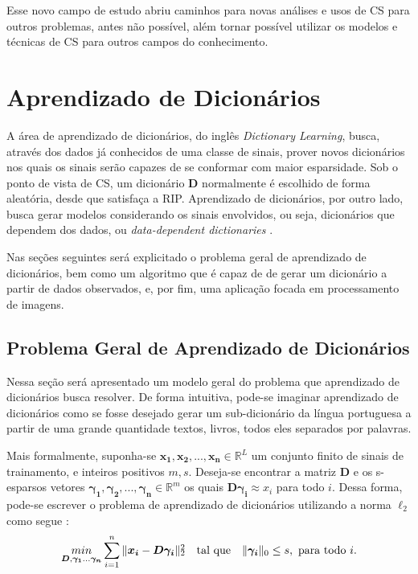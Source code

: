 \documentclass[cic,tc]{iiufrgs}
\def\SPSB#1#2{\rlap{\textsuperscript{#1}}\SB{#2}}
\def\SB#1{\textsubscript{#1}}
\renewcommand{\vec}[1]{\bm{#1}}
\newcommand{\mat}[1]{\bm{#1}}
\begin{document}
Esse novo campo de estudo abriu caminhos para novas análises e usos de CS para outros
problemas, antes não possível, além tornar possível utilizar os modelos e técnicas de CS
para outros campos do conhecimento.


\section{Aprendizado de Dicionários}
A área de aprendizado de dicionários, do inglês \textit{Dictionary Learning}, busca, através
dos dados já conhecidos de uma classe de sinais, prover novos dicionários nos quais os sinais 
serão capazes de se conformar com maior esparsidade. 
Sob o ponto de vista de CS, um dicionário $\mat{D}$ normalmente é escolhido de forma aleatória,
desde que satisfaça a RIP.
Aprendizado de dicionários, por outro lado, busca gerar modelos considerando os sinais envolvidos,
ou seja, dicionários que dependem dos dados, ou \textit{data-dependent dictionaries} \cite{chen2015compressed}.

Nas seções seguintes será explicitado o problema geral de aprendizado de dicionários, bem como 
um algoritmo que é capaz de de gerar um dicionário a partir de dados observados, e, por fim, 
uma aplicação focada em processamento de imagens.

\subsection{Problema Geral de Aprendizado de Dicionários}
Nessa seção será apresentado um modelo geral do problema que aprendizado de dicionários busca resolver.
De forma intuitiva, pode-se imaginar aprendizado de dicionários como se fosse desejado gerar 
um sub-dicionário da língua portuguesa a partir de uma grande quantidade textos, livros, todos 
eles separados por palavras.

Mais formalmente, suponha-se $\vec{x_1}, \vec{x_2}, ..., \vec{x_n} \in \mathbb{R}^L$
um conjunto finito de sinais de trainamento, e inteiros positivos $m, s$.
Deseja-se encontrar a matriz $\mat{D}$ e os s-esparsos vetores 
$\vec{\gamma_1}, \vec{\gamma_2}, ..., \vec{\gamma_n} \in \mathbb{R}^m$ os quais
$\mat{D}\vec{\gamma_i} \approx x_i$ para todo $i$. Dessa forma, pode-se escrever o problema
de aprendizado de dicionários utilizando a norma $\ell_2$ como segue  \cite{chen2015compressed}:
\begin{equation}
    \label{eq:dlgeneral}
    \underset{\mat{D}, \vec{\gamma_1}...\vec{\gamma_n}}{min} 
    \sum_{i=1}^{n} {\lVert  \vec{x_i} - \mat{D} \vec{\gamma_i} \rVert \SPSB{2}{2}}
    \hspace{1em} \text{tal que} \hspace{1em}
    \lVert \vec{\gamma_i} \rVert_0 \le s, \text{ para todo } i.
\end{equation}
\end{document}
